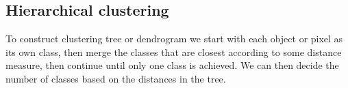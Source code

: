 \subsection*{Hierarchical clustering}
To construct clustering tree or dendrogram we start with each object or pixel as its own class, then merge the classes that are closest according to some distance measure, then continue until only one class is achieved. We can then decide the number of classes based on the distances in the tree. 




